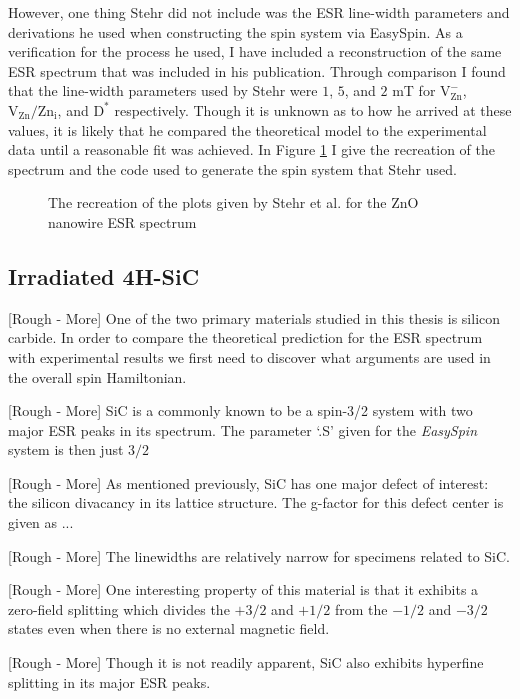 \documentclass[oneside, astronomy, noacknowlegments]{BYUPhys}
\begin{document}
However, one thing Stehr did not include was the ESR line-width parameters and derivations he used when constructing the spin system via EasySpin. As a verification for the process he used, I have included a reconstruction of the same ESR spectrum that was included in his publication. Through comparison I found that the line-width parameters used by Stehr were $1$, $5$, and $2$ mT for 
$\text{V}_{\text{Zn}}^{-}$, $\text{V}_{\text{Zn}}/\text{Zn}_{\text{i}}$, and $\text{D}^{*}$ respectively. Though it is unknown as to how he arrived at these values, it is likely that he compared the theoretical model to the experimental data until a reasonable fit was achieved. In Figure \ref{fig:StehrRec} I give the recreation of the spectrum and the code used to generate the spin system that Stehr used.

\begin{figure}
    \caption[Recreation of ZnO Nanowire ESR]{\label{fig:StehrRec}
     The recreation of the plots given by Stehr et al. for the ZnO nanowire ESR spectrum}
 \end{figure}

\subsection{Irradiated 4H-SiC}

[Rough - More] One of the two primary materials studied in this thesis is silicon carbide. In order to compare the theoretical prediction for the ESR spectrum with experimental results we first need to discover what arguments are used in the overall spin Hamiltonian.

[Rough - More] SiC is a commonly known to be a spin-3/2 system with two major ESR peaks in its spectrum. The parameter `.S' given for the \textit{EasySpin} system is then just $3/2$

[Rough - More] As mentioned previously, SiC has one major defect of interest: the silicon divacancy in its lattice structure. The g-factor for this defect center is given as ...

[Rough - More] The linewidths are relatively narrow for specimens related to SiC.

[Rough - More] One interesting property of this material is that it exhibits a zero-field splitting which divides the $+3/2$ and $+1/2$ from the $-1/2$ and $-3/2$ states even when there is no external magnetic field.

[Rough - More] Though it is not readily apparent, SiC also exhibits hyperfine splitting in its major ESR peaks.
\end{document}
